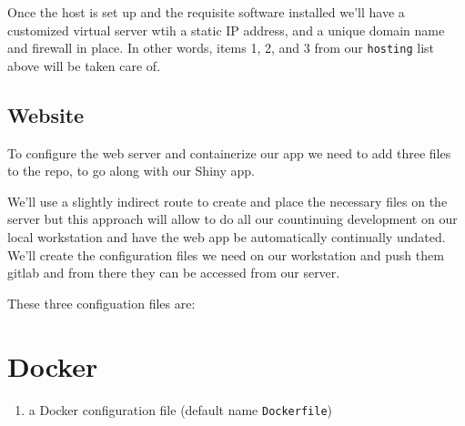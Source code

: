 \documentclass[
  letterpaper,
  DIV=11,
  numbers=noendperiod,
  oneside]{scrartcl}
\providecommand{\tightlist}{%
  \setlength{\itemsep}{0pt}\setlength{\parskip}{0pt}}\usepackage{longtable,booktabs,array}
\begin{document}
Once the host is set up and the requisite software installed we'll have
a customized virtual server wtih a static IP address, and a unique
domain name and firewall in place. In other words, items 1, 2, and 3
from our \texttt{hosting} list above will be taken care of.

\hypertarget{website}{%
\subsection{Website}\label{website}}

To configure the web server and containerize our app we need to add
three files to the repo, to go along with our Shiny app.

We'll use a slightly indirect route to create and place the necessary
files on the server but this approach will allow to do all our
countinuing development on our local workstation and have the web app be
automatically continually undated. We'll create the configuration files
we need on our workstation and push them gitlab and from there they can
be accessed from our server.

These three configuation files are:

\hypertarget{docker}{%
\section{Docker}\label{docker}}

\begin{enumerate}
\def\labelenumi{\arabic{enumi}.}
\tightlist
\item
  a Docker configuration file (default name \texttt{Dockerfile})
\end{enumerate}

\end{document}
